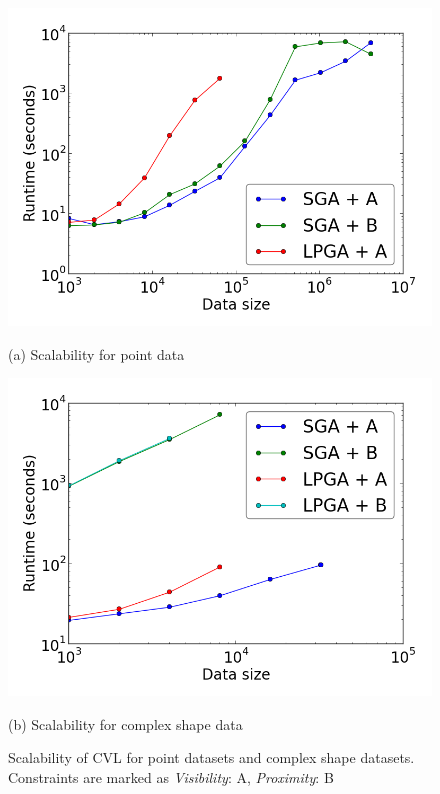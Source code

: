 
\begin{figure}[tb]
  \begin{minipage}{0.49\linewidth}
    \centerline{\includegraphics[width=0.75\linewidth]{./figs/scal_pnt_30m_synthetic.png}}
    \centerline{(a) Scalability for point data}
  \end{minipage} \hfill
  \begin{minipage}{0.49\linewidth}
    \centerline{\includegraphics[width=0.75\linewidth]{./figs/scal_lin_30k_uswaterway.png}}
    \centerline{(b) Scalability for complex shape data}
  \end{minipage} \hfill
  \vspace{-0ex}
  \caption{Scalability of CVL for point datasets and complex shape datasets. Constraints are marked as \emph{Visibility}: A, \emph{Proximity}: B} \label{fig:scalability}
  \vspace{-1ex}
\end{figure}

